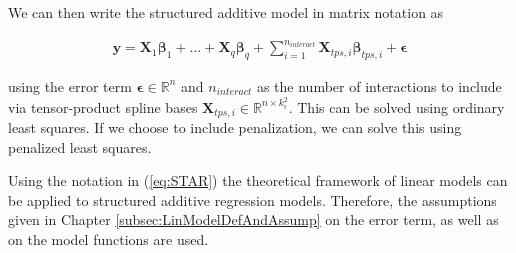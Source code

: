 \documentclass[10pt,a4paper]{article}
\begin{document}
We can then write the structured additive model in matrix notation as 

\begin{align} \label{eq:STAR}
	\boldsymbol{y} = \boldsymbol{X}_1 \boldsymbol{\beta}_1 + \dots + \boldsymbol{X}_q \boldsymbol{\beta}_q + \sum_{i=1}^{n_{interact}} \boldsymbol{X}_{tps, i} \boldsymbol{\beta}_{tps,i} + \boldsymbol{\epsilon}
\end{align}

using the error term $\boldsymbol{\epsilon} \in \mathbb{R}^n$ and $n_{interact}$ as the number of interactions to include via tensor-product spline bases $\boldsymbol{X}_{tps,i} \in \mathbb{R}^{n \times k_i^2}$. This can be solved using ordinary least squares. If we choose to include penalization, we can solve this using penalized least squares. 

Using the notation in (\ref{eq:STAR}) the theoretical framework of linear models can be applied to structured additive regression models. Therefore, the assumptions given in Chapter \ref{subsec:LinModelDefAndAssump} on the error term, as well as on the model functions are used. \cite{fahrmeir2004penalized}

\printbibliography
	
\end{document}

